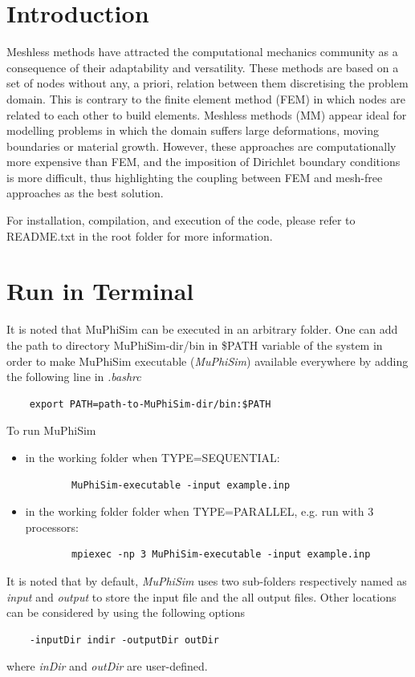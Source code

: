 \documentclass[oneside,11pt,times]{book}
\begin{document}
\section{Introduction}

Meshless methods have attracted the computational mechanics community as a consequence of their adaptability and versatility. These methods are based on a set of nodes without any, a priori, relation between them discretising the problem domain. This is contrary to the finite element method (FEM) in which  nodes are related to each other to build elements. Meshless methods (MM) appear ideal for modelling problems in which the domain suffers large deformations, moving boundaries or material growth. However, these approaches are computationally more expensive than FEM, and the imposition of Dirichlet boundary conditions is more difficult, thus highlighting the coupling between FEM and mesh-free approaches as the best solution.

For installation,  compilation, and execution of the code, please refer to README.txt in the root folder for more information.

\section{Run in Terminal}
It is noted that MuPhiSim can be executed in an arbitrary folder. One can add the path to directory MuPhiSim-dir/bin in \$PATH variable of the system in order to make MuPhiSim executable (\emph{MuPhiSim}) available everywhere by adding the following line in \emph{.bashrc}
\begin{lstlisting}
	export PATH=path-to-MuPhiSim-dir/bin:$PATH
\end{lstlisting}
To run MuPhiSim
\begin{itemize}
	\item in the working folder when TYPE=SEQUENTIAL:
	\begin{lstlisting}
		MuPhiSim-executable -input example.inp
	\end{lstlisting}
	\item in the working folder folder when TYPE=PARALLEL, e.g. run with 3 processors:
	\begin{lstlisting}
		mpiexec -np 3 MuPhiSim-executable -input example.inp
	\end{lstlisting}
\end{itemize}
It is noted that by default, \emph{MuPhiSim} uses two sub-folders respectively named as \emph{input} and \emph{output} to store the input file and the all output files. Other locations can be considered by using the following options
\begin{lstlisting}
	-inputDir indir -outputDir outDir
\end{lstlisting}
where \textit{inDir} and \textit{outDir} are user-defined. 
\end{document}

